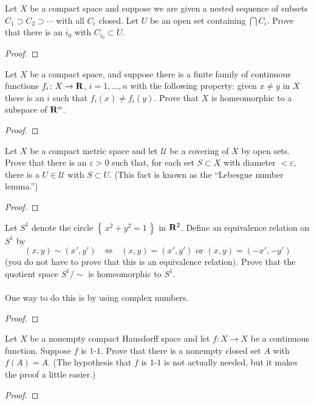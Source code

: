 \begin{problem}
Let $X$ be a compact space and suppose we are given a nested
sequence of subsets $C_1\supset C_2\supset\cdots$ with all $C_i$
closed. Let $U$ be an open set containing $\bigcap C_i$. Prove
that there is an $i_0$ with $C_{i_0}\subset U$.
\end{problem}
\begin{proof}
\end{proof}
\begin{problem}
Let $X$ be a compact space, and suppose there is a finite family
of continuous functions $f_i\colon X\to\mathbf{R}$, $i=1,...,n$ with the
following property: given $x\neq y$ in $X$ there is an $i$ such
that $f_i(x)\neq f_i(y)$. Prove that $X$ is homeomorphic to a
subspace of $\mathbf{R}^n$.
\end{problem}
\begin{proof}
\end{proof}
\begin{problem}
Let $X$ be a compact metric space and let $\mathcal{U}$ be a
covering of $X$ by open sets. Prove that there is an
$\varepsilon>0$ such that, for each set $S\subset X$ with
diameter $<\varepsilon$, there is a $U\in\mathcal{U}$ with
$S\subset U$. (This fact is known as the ``Lebesgue number lemma.'')
\end{problem}
\begin{proof}
\end{proof}
\begin{problem}
Let $S^1$ denote the circle $\left\{\,x^2+y^2=1\,\right\}$ in
$\mathbf{R}^2$. Define an equivalence relation on $S^1$ by
\[\text{$(x,y)\sim (x',y')$ $\iff$ $(x,y)=(x',y')$ or $(x,y)=(-x',-y')$}\]
(you do not have to prove that this is an equivalence
relation). Prove that the quotient space $S^1/{\sim}$ is
homeomorphic to $S^1$.
\\\\
One way to do this is by using complex numbers.
\end{problem}
\begin{proof}
\end{proof}
\begin{problem}
Let $X$ be a nonempty compact Hausdorff space and let $f\colon
X\to X$ be a continuous function. Suppose $f$ is $1$-$1$. Prove
that there is a nonempty closed set $A$ with $f(A)=A$. (The
hypothesis that $f$ is $1$-$1$ is not actually needed, but it
makes the proof a little easier.)
\end{problem}
\begin{proof}
\end{proof}
